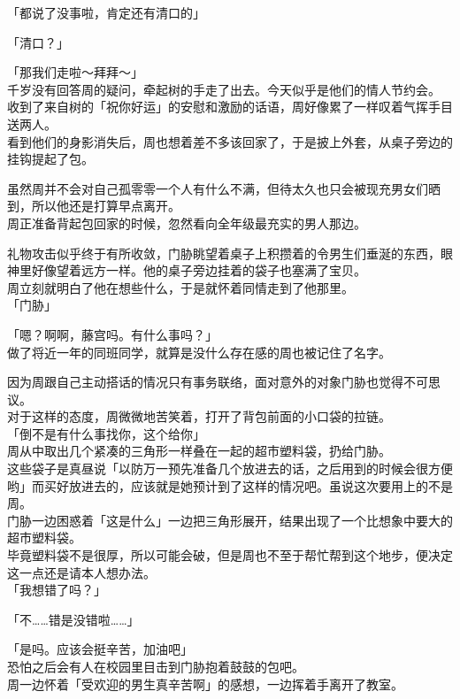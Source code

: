 「都说了没事啦，肯定还有清口的」

「清口？」

「那我们走啦～拜拜～」\\

千岁没有回答周的疑问，牵起树的手走了出去。今天似乎是他们的情人节约会。\\

收到了来自树的「祝你好运」的安慰和激励的话语，周好像累了一样叹着气挥手目送两人。\\

看到他们的身影消失后，周也想着差不多该回家了，于是披上外套，从桌子旁边的挂钩提起了包。

虽然周并不会对自己孤零零一个人有什么不满，但待太久也只会被现充男女们晒到，所以他还是打算早点离开。\\

周正准备背起包回家的时候，忽然看向全年级最充实的男人那边。

礼物攻击似乎终于有所收敛，门胁眺望着桌子上积攒着的令男生们垂涎的东西，眼神里好像望着远方一样。他的桌子旁边挂着的袋子也塞满了宝贝。\\

周立刻就明白了他在想些什么，于是就怀着同情走到了他那里。\\

「门胁」

「嗯？啊啊，藤宫吗。有什么事吗？」\\

做了将近一年的同班同学，就算是没什么存在感的周也被记住了名字。

因为周跟自己主动搭话的情况只有事务联络，面对意外的对象门胁也觉得不可思议。\\

对于这样的态度，周微微地苦笑着，打开了背包前面的小口袋的拉链。\\

「倒不是有什么事找你，这个给你」\\

周从中取出几个紧凑的三角形一样叠在一起的超市塑料袋，扔给门胁。\\

这些袋子是真昼说「以防万一预先准备几个放进去的话，之后用到的时候会很方便哟」而买好放进去的，应该就是她预计到了这样的情况吧。虽说这次要用上的不是周。\\

门胁一边困惑着「这是什么」一边把三角形展开，结果出现了一个比想象中要大的超市塑料袋。\\

毕竟塑料袋不是很厚，所以可能会破，但是周也不至于帮忙帮到这个地步，便决定这一点还是请本人想办法。\\

「我想错了吗？」

「不……错是没错啦……」

「是吗。应该会挺辛苦，加油吧」\\

恐怕之后会有人在校园里目击到门胁抱着鼓鼓的包吧。\\

周一边怀着「受欢迎的男生真辛苦啊」的感想，一边挥着手离开了教室。


